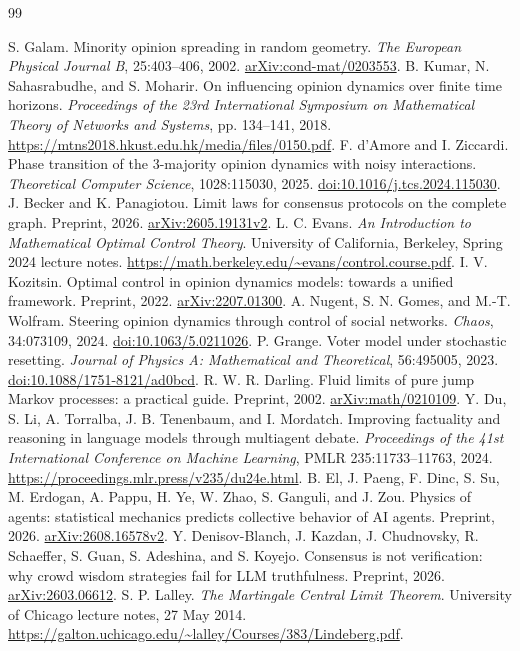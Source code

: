 \documentclass[11pt]{article}
\theoremstyle{remark}\newtheorem{remark}[theorem]{Remark}
\begin{document}
\FloatBarrier
\begin{thebibliography}{99}
\raggedright
{} S. Galam. Minority opinion spreading in random geometry. \emph{The European Physical Journal B}, 25:403--406, 2002. \href{https://arxiv.org/abs/cond-mat/0203553}{arXiv:cond-mat/0203553}.
 B. Kumar, N. Sahasrabudhe, and S. Moharir. On influencing opinion dynamics over finite time horizons. \emph{Proceedings of the 23rd International Symposium on Mathematical Theory of Networks and Systems}, pp. 134--141, 2018. \url{https://mtns2018.hkust.edu.hk/media/files/0150.pdf}.
 F. d'Amore and I. Ziccardi. Phase transition of the 3-majority opinion dynamics with noisy interactions. \emph{Theoretical Computer Science}, 1028:115030, 2025. \href{https://doi.org/10.1016/j.tcs.2024.115030}{doi:10.1016/j.tcs.2024.115030}.
 J. Becker and K. Panagiotou. Limit laws for consensus protocols on the complete graph. Preprint, 2026. \href{https://arxiv.org/abs/2605.19131v2}{arXiv:2605.19131v2}.
 L. C. Evans. \emph{An Introduction to Mathematical Optimal Control Theory}. University of California, Berkeley, Spring 2024 lecture notes. \url{https://math.berkeley.edu/~evans/control.course.pdf}.
 I. V. Kozitsin. Optimal control in opinion dynamics models: towards a unified framework. Preprint, 2022. \href{https://arxiv.org/abs/2207.01300}{arXiv:2207.01300}.
 A. Nugent, S. N. Gomes, and M.-T. Wolfram. Steering opinion dynamics through control of social networks. \emph{Chaos}, 34:073109, 2024. \href{https://doi.org/10.1063/5.0211026}{doi:10.1063/5.0211026}.
 P. Grange. Voter model under stochastic resetting. \emph{Journal of Physics A: Mathematical and Theoretical}, 56:495005, 2023. \href{https://doi.org/10.1088/1751-8121/ad0bcd}{doi:10.1088/1751-8121/ad0bcd}.
 R. W. R. Darling. Fluid limits of pure jump Markov processes: a practical guide. Preprint, 2002. \href{https://arxiv.org/abs/math/0210109}{arXiv:math/0210109}.
 Y. Du, S. Li, A. Torralba, J. B. Tenenbaum, and I. Mordatch. Improving factuality and reasoning in language models through multiagent debate. \emph{Proceedings of the 41st International Conference on Machine Learning}, PMLR 235:11733--11763, 2024. \url{https://proceedings.mlr.press/v235/du24e.html}.
 B. El, J. Paeng, F. Dinc, S. Su, M. Erdogan, A. Pappu, H. Ye, W. Zhao, S. Ganguli, and J. Zou. Physics of agents: statistical mechanics predicts collective behavior of AI agents. Preprint, 2026. \href{https://arxiv.org/abs/2608.16578v2}{arXiv:2608.16578v2}.
 Y. Denisov-Blanch, J. Kazdan, J. Chudnovsky, R. Schaeffer, S. Guan, S. Adeshina, and S. Koyejo. Consensus is not verification: why crowd wisdom strategies fail for LLM truthfulness. Preprint, 2026. \href{https://arxiv.org/abs/2603.06612}{arXiv:2603.06612}.
 S. P. Lalley. \emph{The Martingale Central Limit Theorem}. University of Chicago lecture notes, 27 May 2014. \url{https://galton.uchicago.edu/~lalley/Courses/383/Lindeberg.pdf}.
\end{thebibliography}
\end{document}
